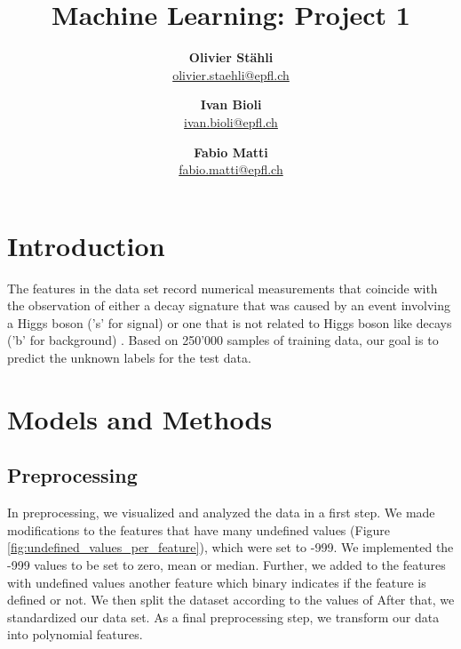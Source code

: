 \documentclass[11pt, a4paper, twocolumn]{article}
\title{\bfseries Machine Learning: Project 1}
\author{\textbf{Olivier Stähli} \\ \href{mailto:olivier.staehli@epfl.ch}{olivier.staehli@epfl.ch}
   \and \textbf{Ivan Bioli} \\ \href{mailto:ivan.bioli@epfl.ch}{ivan.bioli@epfl.ch}
   \and \textbf{Fabio Matti} \\ \href{mailto:fabio.matti@epfl.ch}{fabio.matti@epfl.ch}}
\date{}
\begin{document}

\section{Introduction}
\label{sec:introduction}

The features in the data set record numerical measurements that coincide with the observation of either a decay signature that was caused by an event involving a Higgs boson ('s' for signal) or one that is not related to Higgs boson like decays ('b' for background) \cite{higgs2014}. Based on 250'000 samples of training data, our goal is to predict the unknown labels for the test data.

\section{Models and Methods}
\label{sec:models}

\subsection{Preprocessing}
\label{subsec:preprocessing}
In preprocessing, we visualized and analyzed the data in a first step. We made modifications to the features that have many undefined values (Figure \ref{fig:undefined_values_per_feature}), which were set to -999.
We implemented the -999 values to be set to zero, mean or median. Further, we added to the features with undefined values another feature which binary indicates if the feature is defined or not. We then split the dataset according to the values of 
After that, we standardized our data set. As a final preprocessing step, we transform our data into polynomial features.
\end{document}
